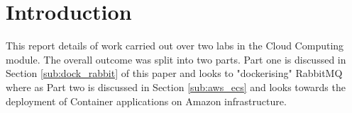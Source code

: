 \section{Introduction}
This report details of work carried out over two labs in the Cloud Computing module. The overall outcome was split into two parts. Part one is discussed in Section \ref{sub:dock_rabbit} of this paper and looks to "dockerising" RabbitMQ where as Part two is discussed in Section \ref{sub:aws_ecs} and looks towards the deployment of Container applications on Amazon infrastructure.
